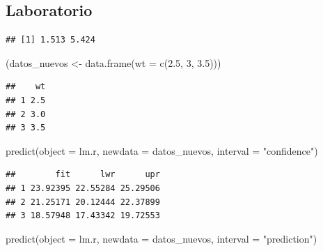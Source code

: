 \documentclass[
  12pt,
]{book}
\newenvironment{Shaded}{\begin{snugshade}}{\end{snugshade}}
\newcommand{\AttributeTok}[1]{\textcolor[rgb]{0.77,0.63,0.00}{#1}}
\newcommand{\DecValTok}[1]{\textcolor[rgb]{0.00,0.00,0.81}{#1}}
\newcommand{\FloatTok}[1]{\textcolor[rgb]{0.00,0.00,0.81}{#1}}
\newcommand{\FunctionTok}[1]{\textcolor[rgb]{0.00,0.00,0.00}{#1}}
\newcommand{\NormalTok}[1]{#1}
\newcommand{\OtherTok}[1]{\textcolor[rgb]{0.56,0.35,0.01}{#1}}
\newcommand{\SpecialCharTok}[1]{\textcolor[rgb]{0.00,0.00,0.00}{#1}}
\newcommand{\StringTok}[1]{\textcolor[rgb]{0.31,0.60,0.02}{#1}}
\theoremstyle{definition}
\theoremstyle{definition}
\theoremstyle{definition}
\theoremstyle{remark}
\begin{document}
\hypertarget{laboratorio-4}{%
\subsection{Laboratorio}\label{laboratorio-4}}

\begin{Shaded}
\end{Shaded}

\begin{verbatim}
## [1] 1.513 5.424
\end{verbatim}

\begin{Shaded}
\begin{Highlighting}[]
\NormalTok{(datos\_nuevos }\OtherTok{\textless{}{-}} \FunctionTok{data.frame}\NormalTok{(}\AttributeTok{wt =} \FunctionTok{c}\NormalTok{(}\FloatTok{2.5}\NormalTok{, }\DecValTok{3}\NormalTok{, }\FloatTok{3.5}\NormalTok{)))}
\end{Highlighting}
\end{Shaded}

\begin{verbatim}
##    wt
## 1 2.5
## 2 3.0
## 3 3.5
\end{verbatim}

\begin{Shaded}
\begin{Highlighting}[]
\FunctionTok{predict}\NormalTok{(}\AttributeTok{object =}\NormalTok{ lm.r, }\AttributeTok{newdata =}\NormalTok{ datos\_nuevos, }\AttributeTok{interval =} \StringTok{"confidence"}\NormalTok{)}
\end{Highlighting}
\end{Shaded}

\begin{verbatim}
##        fit      lwr      upr
## 1 23.92395 22.55284 25.29506
## 2 21.25171 20.12444 22.37899
## 3 18.57948 17.43342 19.72553
\end{verbatim}

\begin{Shaded}
\begin{Highlighting}[]
\FunctionTok{predict}\NormalTok{(}\AttributeTok{object =}\NormalTok{ lm.r, }\AttributeTok{newdata =}\NormalTok{ datos\_nuevos, }\AttributeTok{interval =} \StringTok{"prediction"}\NormalTok{)}
\end{Highlighting}
\end{Shaded}
\end{document}
